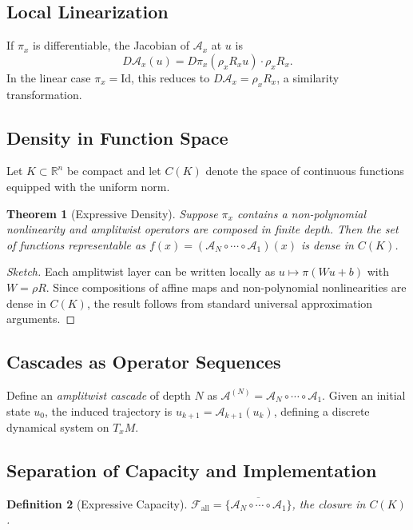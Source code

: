 \documentclass[12pt, a4paper]{article}
\newtheorem{theorem}{Theorem}[section]
\newtheorem{definition}[theorem]{Definition}
\theoremstyle{remark}
\theoremstyle{definition}
\begin{document}
\subsection{Local Linearization}

If $\pi_x$ is differentiable, the Jacobian of $\mathcal{A}_x$ at $u$ is
\[
D\mathcal{A}_x(u) = D\pi_x(\rho_x R_x u)\cdot \rho_x R_x.
\]
In the linear case $\pi_x = \mathrm{Id}$, this reduces to $D\mathcal{A}_x = \rho_x R_x$,
a similarity transformation.

\subsection{Density in Function Space}

Let $K \subset \mathbb{R}^n$ be compact and let $C(K)$ denote the space of continuous
functions equipped with the uniform norm.

\begin{theorem}[Expressive Density]
\label{thm:density}
Suppose $\pi_x$ contains a non-polynomial nonlinearity and amplitwist operators are
composed in finite depth.  Then the set of functions representable as
$f(x) = (\mathcal{A}_N \circ \cdots \circ \mathcal{A}_1)(x)$
is dense in $C(K)$.
\end{theorem}

\begin{proof}[Sketch]
Each amplitwist layer can be written locally as $u \mapsto \pi(Wu + b)$ with $W = \rho R$.
Since compositions of affine maps and non-polynomial nonlinearities are dense in $C(K)$,
the result follows from standard universal approximation arguments.
\end{proof}

\subsection{Cascades as Operator Sequences}

Define an \emph{amplitwist cascade} of depth $N$ as
$\mathcal{A}^{(N)} = \mathcal{A}_N \circ \cdots \circ \mathcal{A}_1$.
Given an initial state $u_0$, the induced trajectory is $u_{k+1} = \mathcal{A}_{k+1}(u_k)$,
defining a discrete dynamical system on $T_x M$.

\subsection{Separation of Capacity and Implementation}

\begin{definition}[Expressive Capacity]
$\mathcal{F}_{\mathrm{all}} = \overline{\{\mathcal{A}_N \circ \cdots \circ \mathcal{A}_1\}}$,
the closure in $C(K)$.
\end{definition}
\end{document}
